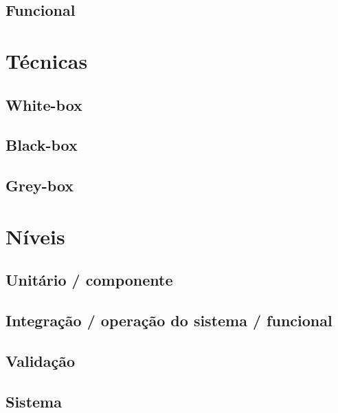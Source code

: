 \documentclass[
	12pt,				%
	openright,			%
	twoside,			%
	a4paper,			%
	english,			%
	brazil,				%
	]{abntex2}
\begin{document}
\subsection{Funcional}

\section{Técnicas}


\subsection{White-box}


\subsection{Black-box}


\subsection{Grey-box}

\section{Níveis}


\subsection{Unitário / componente}


\subsection{Integração / operação do sistema / funcional}


\subsection{Validação}


\subsection{Sistema}

\end{document}
